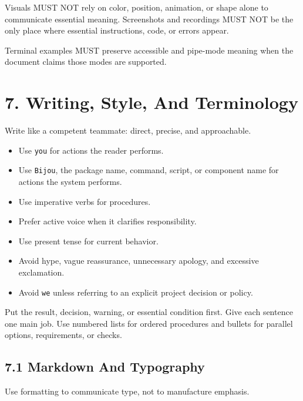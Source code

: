 Visuals MUST NOT rely on color, position, animation, or shape alone to communicate essential meaning. Screenshots and recordings MUST NOT be the only place where essential instructions, code, or errors appear.

Terminal examples MUST preserve accessible and pipe-mode meaning when the document claims those modes are supported.

\section{7. Writing, Style, And Terminology}\label{record-005-writing-style-and-terminology}

Write like a competent teammate: direct, precise, and approachable.

\begin{itemize}
\tightlist
\item
  Use \texttt{y\allowbreak{}o\allowbreak{}u} for actions the reader performs.
\item
  Use \texttt{B\allowbreak{}i\allowbreak{}j\allowbreak{}o\allowbreak{}u}, the package name, command, script, or component name for actions the system performs.
\item
  Use imperative verbs for procedures.
\item
  Prefer active voice when it clarifies responsibility.
\item
  Use present tense for current behavior.
\item
  Avoid hype, vague reassurance, unnecessary apology, and excessive exclamation.
\item
  Avoid \texttt{w\allowbreak{}e} unless referring to an explicit project decision or policy.
\end{itemize}

Put the result, decision, warning, or essential condition first. Give each sentence one main job. Use numbered lists for ordered procedures and bullets for parallel options, requirements, or checks.

\subsection{7.1 Markdown And Typography}\label{record-005-markdown-and-typography}

Use formatting to communicate type, not to manufacture emphasis.

